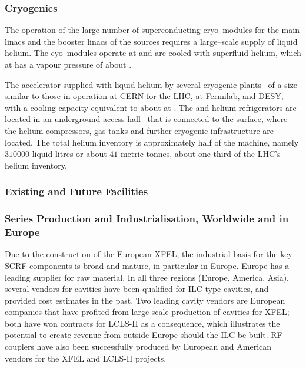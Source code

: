 \subsubsection{Cryogenics}

The operation of the large number of superconducting cryo--modules for the main linacs and the booster linacs of the sources requires a large--scale supply of liquid helium.
The cyo--modules operate at  and are cooled with superfluid helium, which at  has a vapour pressure of about .


The accelerator supplied with liquid helium by several cryogenic plants~\cite[Sec. 3.5]{Adolphsen:2013kya} of a size similar to those in operation at CERN for the LHC, at Fermilab, and DESY,
with a cooling capacity equivalent to about  at .
The  and  helium refrigerators are located in an underground access hall~\cite{bib:cr-0014} that is connected to the surface, where the helium compressors, gas tanks and further cryogenic infrastructure are located.
The total helium inventory is approximately half of the  machine, namely $310 000$ liquid litres or about $41$ metric tonnes, about one third of the LHC's helium inventory.


\subsubsection{Existing and Future Facilities}

\subsubsection{Series Production and Industrialisation, Worldwide and in Europe}

Due to the construction of the European XFEL, the industrial basis for the key SCRF components is broad and mature, in particular in Europe.
Europe has a leading supplier for raw material. 
In all three regions (Europe, America, Asia), several vendors for cavities have been qualified for ILC type cavities, and provided cost estimates in the past.
Two leading cavity vendors are European companies that have profited from large scale production of cavities for XFEL; 
both have won contracts for LCLS-II as a consequence, which illustrates the potential to create revenue from outside Europe should the ILC be built.
RF couplers have also been successfully produced by European and  American vendors for the XFEL and LCLS-II projects.

